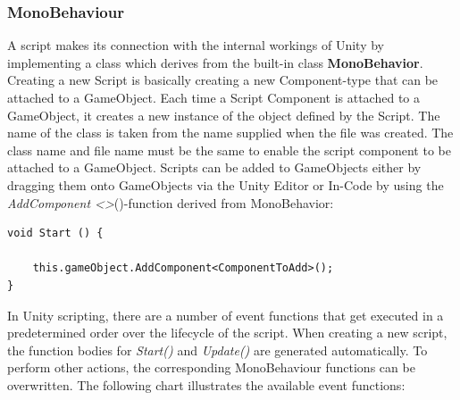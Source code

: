 \subsubsection{MonoBehaviour}
A script makes its connection with the internal workings of Unity by implementing a class which derives from the built-in class \textbf{MonoBehavior}. Creating a new Script is basically creating a new Component-type that can be attached to a GameObject. Each time a Script Component is attached to a GameObject, it creates a new instance of the object defined by the Script. The name of the class is taken from the name supplied when the file was created. The class name and file name must be the same to enable the script component to be attached to a GameObject. Scripts can be added to GameObjects either by dragging them onto GameObjects via the Unity Editor or In-Code by using the \textit{AddComponent \textless \textgreater}()-function derived from MonoBehavior:
\begin{lstlisting}
void Start () {
	
    this.gameObject.AddComponent<ComponentToAdd>();
}
\end{lstlisting}
In Unity scripting, there are a number of event functions that get executed in a predetermined order over the lifecycle of the script. When creating a new script, the function bodies for \textit{Start()} and \textit{Update()} are generated automatically. To perform other actions, the corresponding MonoBehaviour functions can be overwritten. The following chart illustrates the available event functions:

